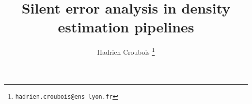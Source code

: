 \documentclass[10pt,a4paper,twoside,twocolumn]{article}
\title{Silent error analysis in density estimation pipelines}
\author{Hadrien Croubois \thanks{\texttt{hadrien.croubois@ens-lyon.fr}}}
\affil{ENS de Lyon\\Argonne National Laboratory}
\date{}
\newcommand*{\rootPath}{}
\begin{document}
\maketitle

\begin{abstract}
\lipsum[1] %
\end{abstract}











\end{document}
